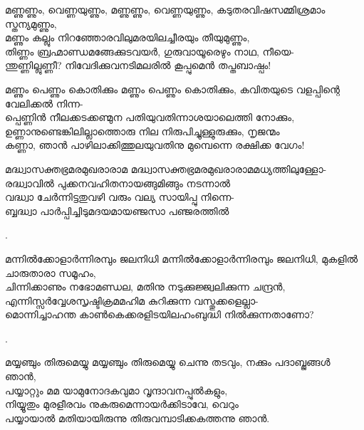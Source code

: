 \begin{enumerate}
\begin{slokam}{\VSr}{\VKG}{മണ്ണുണ്ണും, വെണ്ണയുണ്ണും,}
മണ്ണുണ്ണും, വെണ്ണയുണ്ണും, കടുതരവിഷസമ്മിശ്രമാം സ്തന്യമുണ്ണും,\\
മണ്ണും കല്ലും നിറഞ്ഞോരവിലുമരയിലച്ചീരയും തീയുമുണ്ണും,\\
തിണ്ണം ബ്രഹ്മാണ്ഡമങ്ങേക്കുടവയർ, ഗുരുവായൂരെഴും നാഥ, നീയെ-\\
ന്തുണ്ണില്ലുണ്ണീ? നിവേദിക്കുവനടിമലരിൽ കൂപ്പുമെൻ തപ്തബാഷ്പം!
\end{slokam}


\begin{slokam}{\VSr}{\VKG}{മണ്ണും പെണ്ണും കൊതിക്കും}
 മണ്ണും പെണ്ണും കൊതിക്കും, കവിതയുടെ വളപ്പിന്റെ വേലിക്കൽ നിന്ന-\\
പ്പെണ്ണിൻ നീലക്കടക്കണ്മുന പതിയുവതിന്നാശയാലെത്തി നോക്കും,\\
ഉണ്ണാനുണ്ടെങ്കിലില്ലാത്തൊരു നില നിരുപിച്ചുള്ളുരുക്കും, നൃജന്മം\\
കണ്ണാ, ഞാൻ പാഴിലാക്കിത്തുലയുവതിനു മുമ്പെന്നെ രക്ഷിക്ക വേഗം!
\end{slokam}




\begin{slokam}{\VMk}{\KV}{മദ്ധ്വാസക്തഭ്രമരമുഖരാരാമ}
മദ്ധ്വാസക്തഭ്രമരമുഖരാരാമമധ്യത്തിലുള്ളോ-\\
രദ്ധ്വാവിൽ പുക്കനവഹിതനായങ്ങുമിങ്ങും നടന്നാൽ\\
വദ്ധ്വാ ചേർന്നിട്ടതുവഴി വരും വല്യ സായിപ്പു നിന്നെ-\\
ബ്ബദ്ധ്വാ പാർപ്പിച്ചിടുമദയമായഞ്ജസാ പഞ്ജരത്തിൽ
\end{slokam}


.


\begin{slokam}{\VSr}{\VCBP}{മന്നിൽക്കോളാർന്നിരമ്പും ജലനിധി}
മന്നിൽക്കോളാർന്നിരമ്പും ജലനിധി, മുകളിൽ ചാരുതാരാ സമൂഹം,\\
ചിന്നിക്കാണും നഭോമണ്ഡല, മതിനു നടുക്കുജ്ജ്വലിക്കുന്ന ചന്ദ്രൻ,\\
എന്നിസ്സർവ്വേശസൃഷ്ടിക്രമമഹിമ കുറിക്കുന്ന വസ്തുക്കളെല്ലാ-\\
മൊന്നിച്ചാഹന്ത കാൺകെക്കരളിടയിലഹംബുദ്ധി നിൽക്കുന്നതാണോ?
\end{slokam}


.



\begin{slokam}{\VSv}{\VKG}{മയ്യഞ്ചും തിരുമെയ്യു}
മയ്യഞ്ചും തിരുമെയ്യു ചെന്നു തടവും, നക്കും പദാബ്ജങ്ങള്‍ ഞാൻ,\\
പയ്യാറ്റും മമ യാമുനോദകവുമാ വൃന്ദാവനപ്പുൽകളും,\\
നിയ്യൂതും മുരളീരവം നുകരുമെന്നായർക്കിടാവേ, വെറും\\
പയ്യായാൽ മതിയായിരുന്നു തിരുവമ്പാടിക്കകത്തന്നു ഞാൻ.
\end{slokam}


\end{enumerate}
